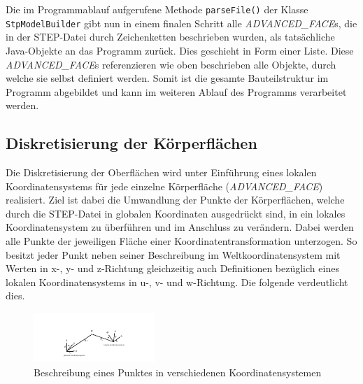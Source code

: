 Die im Programmablauf aufgerufene Methode \verb|parseFile()| der Klasse \verb|StpModelBuilder| gibt nun in einem finalen Schritt alle \textit{ADVANCED\_FACE}s, die in der STEP-Datei durch Zeichenketten beschrieben wurden, als tatsächliche Java-Objekte an das Programm zurück. Dies geschieht in Form einer Liste. Diese \textit{ADVANCED\_FACE}s  referenzieren wie oben beschrieben alle Objekte, durch welche sie selbst definiert werden. Somit ist die gesamte Bauteilstruktur im Programm abgebildet und kann im weiteren Ablauf des Programms verarbeitet werden.

\subsection{Diskretisierung der Körperflächen}

Die Diskretisierung der Oberflächen wird unter Einführung eines lokalen Koordinatensystems für jede einzelne Körperfläche (\textit{ADVANCED\_FACE}) realisiert.
Ziel ist dabei die Umwandlung der Punkte der Körperflächen, welche durch die STEP-Datei in globalen Koordinaten ausgedrückt sind, in ein lokales Koordinatensystem zu überführen und im Anschluss zu verändern. Dabei werden alle Punkte der jeweiligen Fläche einer Koordinatentransformation unterzogen. So besitzt jeder Punkt neben seiner Beschreibung im Weltkoordinatensystem mit Werten in x-, y- und z-Richtung gleichzeitig auch Definitionen bezüglich eines lokalen Koordinatensystems in u-, v- und w-Richtung. Die folgende  verdeutlicht dies. 

\begin{figure}[h]
	\centering
	
	\includegraphics[width=\linewidth]{img/basetrafo.pdf}
	
	\caption{Beschreibung eines Punktes in verschiedenen Koordinatensystemen}
	\label{fig:basetrafo}
	
\end{figure}

